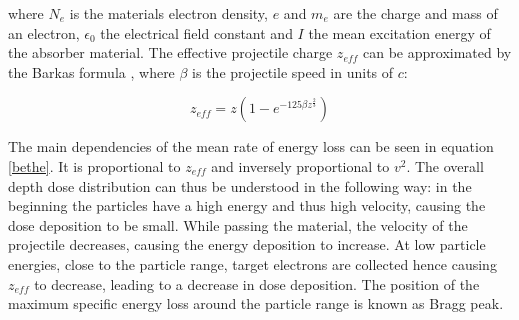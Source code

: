 where $N_{e}$ is the materials electron density, $e$ and $m_{e}$ are the charge and mass 
of an electron, $\epsilon_{0}$ the electrical field constant and $I$ the mean excitation energy of the absorber material. The effective 
projectile charge $z_{eff}$ can be approximated by the Barkas formula \cite{Bar63}, where $\beta$ is the projectile speed in units of 
$c$: 

\vspace*{-0.8cm}
\begin{equation}
 z_{eff} = z \left( 1 - e^{-125 \beta z^{\frac{2}{3}}} \right)
\end{equation}

The main dependencies of the mean rate of energy loss can be seen in equation \ref{bethe}. It is proportional to $z_{eff}$ 
and inversely proportional to $v^{2}$. The overall depth dose distribution can thus be understood in the following way: in the beginning 
the particles have a high energy and thus high velocity, causing the dose deposition to be small. While passing the material, the velocity 
of the projectile decreases, causing the energy deposition to increase. At low particle energies, close to the particle range, 
target electrons are collected hence causing $z_{eff}$ to decrease, leading to a decrease in dose deposition. The position of the maximum 
specific energy loss around the particle range is known as Bragg peak. 

